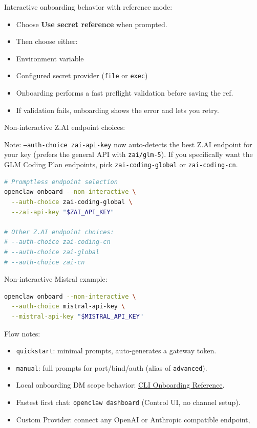 Interactive onboarding behavior with reference mode:

\begin{itemize}
  \item Choose \textbf{Use secret reference} when prompted.
  \item Then choose either:
  \item Environment variable
  \item Configured secret provider (\texttt{file} or \texttt{exec})
  \item Onboarding performs a fast preflight validation before saving the ref.
  \item If validation fails, onboarding shows the error and lets you retry.
\end{itemize}


Non-interactive Z.AI endpoint choices:

Note: \texttt{--auth-choice zai-api-key} now auto-detects the best Z.AI endpoint for your key (prefers the general API with \texttt{zai/glm-5}).
If you specifically want the GLM Coding Plan endpoints, pick \texttt{zai-coding-global} or \texttt{zai-coding-cn}.

\begin{lstlisting}[language=bash]
# Promptless endpoint selection
openclaw onboard --non-interactive \
  --auth-choice zai-coding-global \
  --zai-api-key "$ZAI_API_KEY"

# Other Z.AI endpoint choices:
# --auth-choice zai-coding-cn
# --auth-choice zai-global
# --auth-choice zai-cn
\end{lstlisting}


Non-interactive Mistral example:

\begin{lstlisting}[language=bash]
openclaw onboard --non-interactive \
  --auth-choice mistral-api-key \
  --mistral-api-key "$MISTRAL_API_KEY"
\end{lstlisting}


Flow notes:

\begin{itemize}
  \item \texttt{quickstart}: minimal prompts, auto-generates a gateway token.
  \item \texttt{manual}: full prompts for port/bind/auth (alias of \texttt{advanced}).
  \item Local onboarding DM scope behavior: \href{/start/wizard-cli-reference\#outputs-and-internals}{CLI Onboarding Reference}.
  \item Fastest first chat: \texttt{openclaw dashboard} (Control UI, no channel setup).
  \item Custom Provider: connect any OpenAI or Anthropic compatible endpoint,
\end{itemize}


